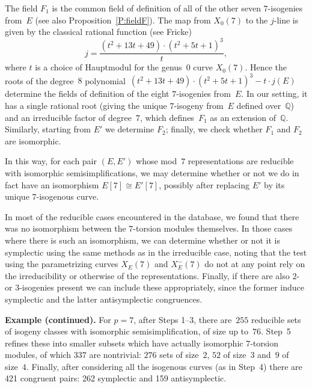 \documentclass[12pt, reqno]{amsart}
\newcommand{\F}{\mathbb{F}}
\newcommand{\Q}{\mathbb{Q}}
\numberwithin{equation}{section}
\theoremstyle{definition}
\theoremstyle{remark}
\begin{document}

The field $F_1$ is the common field of definition of all of the other
seven $7$-isogenies from~$E$ (see also Proposition~\ref{P:fieldF}).
The map from $X_0(7)$ to the $j$-line is given by the classical
rational function (see Fricke)
\[
   j = \frac{(t^{2} + 13t + 49) \cdot (t^{2} + 5t + 1)^{3}}{t},
\]
where $t$ is a choice of Hauptmodul for the genus~$0$ curve
$X_0(7)$. Hence the roots of the degree~$8$ polynomial~$(t^{2} + 13t +
49) \cdot (t^{2} + 5t + 1)^{3} -t\cdot j(E)$ determine the fields of
definition of the eight $7$-isogenies from~$E$. In our setting, it has
a single rational root (giving the unique $7$-isogeny from~$E$ defined
over~$\Q$) and an irreducible factor of degree~$7$, which
defines~$F_1$ as an extension of~$\Q$. Similarly, starting from $E'$
we determine $F_2$; finally, we check whether $F_1$ and $F_2$ are
isomorphic.


In this way, for each pair $(E,E')$ whose 
mod~$7$ representations
are reducible with isomorphic semisimplifications, we may determine
whether or not we do in fact have an isomorphism $E[7]\cong E'[7]$,
possibly after replacing $E'$ by its unique $7$-isogenous curve.

In most of the reducible cases encountered in the database, we found
that there was no isomorphism between the $7$-torsion modules
themselves.  In those cases where there is such an isomorphism, we can
determine whether or not it is symplectic using the same methods as in
the irreducible case, noting that the test using the parametrizing
curves $X_E(7)$ and $X_E^-(7)$ do not at any point rely on the
irreducibility or otherwise of the representations.  Finally, if there
are also $2$-{} or $3$-isogenies present we can include these
appropriately, since the former induce symplectic and the latter
antisymplectic congruences.

{\bf Example (continued).} For $p=7$, after Steps 1--3, there
are~$255$ reducible sets of isogeny classes with isomorphic
semisimplification, of size up to~$76$.  Step~5 refines these into
smaller subsets which have actually isomorphic $7$-torsion modules, of
which $337$ are nontrivial: $276$ sets of size~$2$, $52$ of size~$3$
and~$9$ of size~$4$.  Finally, after considering all the isogenous
curves (as in Step~4) there are 421 congruent pairs: 262 symplectic
and 159 antisymplectic.
\end{document}
